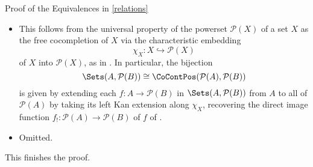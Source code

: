 \begin{Proof}{Proof of the Equivalences in \cref{relations}}
\begin{itemize}
        \item{}This follows from the universal property of the powerset $\mathcal{P}(X)$ of a set $X$ as the free cocompletion of $X$ via the characteristic embedding
            \[
                \chi_{X}
                \colon
                X
                \hookrightarrow
                \mathcal{P}(X)
            \]%
            of $X$ into $\mathcal{P}(X)$, as in . In particular, the bijection
            \[
                \Sets(A,\mathcal{P}(B))%
                \cong
                \CoContPos(\mathcal{P}(A),\mathcal{P}(B))
            \]%
            is given by extending each $f\colon A\to\mathcal{P}(B)$ in $\Sets(A,\mathcal{P}(B))$ from $A$ to all of $\mathcal{P}(A)$ by taking its left Kan extension along $\chi_{X}$, recovering the direct image function $f_{!}\colon\mathcal{P}(A)\to\mathcal{P}(B)$ of $f$ of .
        \item{}Omitted.
    \end{itemize}
    This finishes the proof.
\end{Proof}
